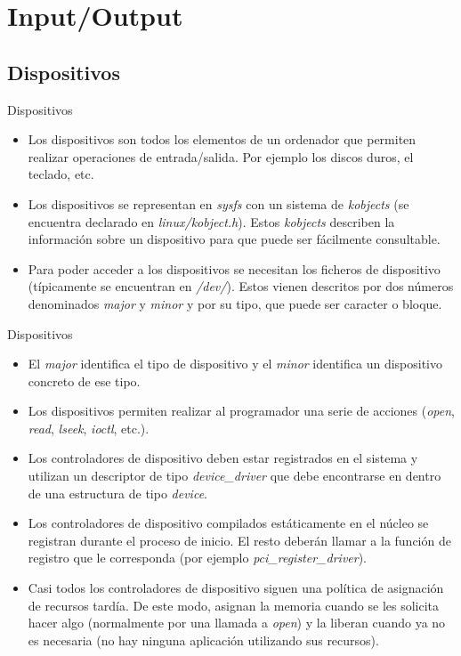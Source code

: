 \section{Input/Output}
\subsection{Dispositivos}
\begin{frame}{Dispositivos}
	\begin{itemize}
		\item Los dispositivos son todos los elementos de un ordenador que permiten realizar operaciones de entrada/salida. Por ejemplo los discos duros, el teclado, etc.
		\item Los dispositivos se representan en \emph{sysfs} con un sistema de \emph{kobjects} (se encuentra declarado en \emph{linux/kobject.h}). Estos \emph{kobjects} describen la información sobre un dispositivo para que puede ser fácilmente consultable.
		\item Para poder acceder a los dispositivos se necesitan los ficheros de dispositivo (típicamente se encuentran en \emph{/dev/}). Estos vienen descritos por dos números denominados \emph{major} y \emph{minor}  y por su tipo, que puede ser caracter o bloque.
	\end{itemize}
\end{frame}

\begin{frame}{Dispositivos}
	\begin{itemize}
		\item El \emph{major} identifica el tipo de dispositivo y el \emph{minor} identifica un dispositivo concreto de ese tipo.
		\item Los dispositivos permiten realizar al programador una serie de acciones (\emph{open}, \emph{read}, \emph{lseek}, \emph{ioctl}, etc.).
		\item Los controladores de dispositivo deben estar registrados en el sistema y utilizan un descriptor de tipo \emph{device\_driver} que debe encontrarse en dentro de una estructura de tipo \emph{device}.
		\item Los controladores de dispositivo compilados estáticamente en el núcleo se registran durante el proceso de inicio. El resto deberán llamar a la función de registro que le corresponda (por ejemplo \emph{pci\_register\_driver}).
		\item Casi todos los controladores de dispositivo siguen una política de asignación de recursos tardía. De este modo, asignan la memoria cuando se les solicita hacer algo (normalmente por una llamada a \emph{open}) y la liberan cuando ya no es necesaria (no hay ninguna aplicación utilizando sus recursos).
	\end{itemize}
\end{frame}

